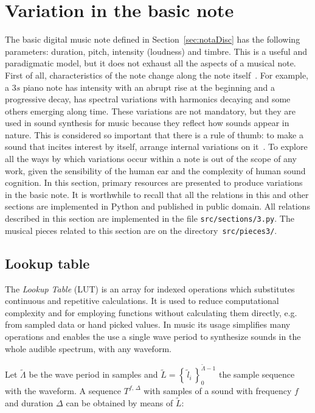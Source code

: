 \section{Variation in the basic note}\label{sec:internalVar}\label{sec:varInternas}
The basic digital music note defined in Section~\ref{sec:notaDisc} has the following parameters: duration, pitch, intensity (loudness) and timbre. This is a useful and paradigmatic model, but it does not exhaust all the aspects of a musical note. First of all, characteristics of the note change along the note itself~\cite{Chowning}. For example, a $3s$ piano note has intensity with an abrupt rise at the beginning and a progressive decay, has spectral variations with harmonics decaying and some others emerging along time. These variations are not mandatory, but they are used in sound synthesis for music because they reflect how sounds appear in nature. This is considered so important that there is a rule of thumb: to make a sound that incites interest by itself, arrange internal variations on it~\cite{Roederer}.
To explore all the ways by which variations occur within a note is out of the scope of any work, given the sensibility of the human ear and the complexity of human sound cognition. In this section, primary resources are presented to produce variations in the basic note. It is worthwhile to recall that all the relations in this and other sections are implemented in Python and published in public domain. All relations described in this section are implemented in the file \texttt{src/sections/3.py}.
The musical pieces related to this section are on the directory~\texttt{src/pieces3/}.~\cite{MASSA}
 
\subsection{Lookup table}\label{subsec:lookup}
The \emph{Lookup Table} (LUT) is an array for indexed operations which substitutes continuous and repetitive calculations.
It is used to reduce computational complexity and for employing functions without calculating them directly, e.g. from sampled data or hand picked values.
In music its usage simplifies many operations and enables the use a single wave period to synthesize sounds in the whole audible spectrum, with any waveform.

Let $\widetilde{\Lambda}$ be the wave period in samples and $\widetilde{L} = \left\{\, \widetilde{l}_i \,\right\}_0^{\widetilde{\Lambda} -1}$ the sample sequence with the waveform.
A sequence $T^{f,\,\Delta}$ with samples of a sound with frequency $f$ and duration $\Delta$ can be obtained by means of $\widetilde{L}$:

